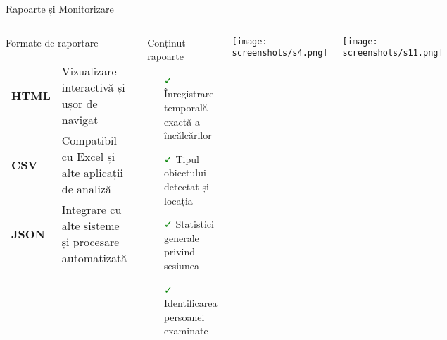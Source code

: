 \documentclass[aspectratio=169,9pt]{beamer}
\newenvironment{cardblock}[1]{%
    \begin{block}{#1}
}{%
    \end{block}
}
\begin{document}
\begin{frame}{Rapoarte și Monitorizare}
        \vspace{-1.3cm}
        \begin{columns}
                \hspace{0.25cm}
                        \begin{cardblock}{Formate de raportare}
                                \small
                                \begin{tabular}{p{1.5cm}p{6.5cm}}
                                        \cellcolor{lightblue!30}\textcolor{mainblue!60!black}{\textbf{HTML}} & Vizualizare interactivă și ușor de navigat \\
                                        \cellcolor{lightgreen}\textcolor{green!60!black}{\textbf{CSV}} & Compatibil cu Excel și alte aplicații de analiză \\
                                        \cellcolor{lightyellow}\textcolor{yellow!60!black}{\textbf{JSON}} & Integrare cu alte sisteme și procesare automatizată \\
                                \end{tabular}
                        \end{cardblock}    
                        \vspace{0.2cm}
                        
                        \begin{cardblock}{Conținut rapoarte}
                                \small
                                \begin{itemize}[leftmargin=0.5cm,itemsep=0.05cm]
                                        \item[\textcolor{green}{\faCheck}] Înregistrare temporală exactă a încălcărilor
                                        \item[\textcolor{green}{\faCheck}] Tipul obiectului detectat și locația
                                        \item[\textcolor{green}{\faCheck}] Statistici generale privind sesiunea
                                        \item[\textcolor{green}{\faCheck}] Identificarea persoanei examinate
                                \end{itemize}
                        \end{cardblock}
                        
                        \centering\texttt{[image: screenshots/s4.png]}
                        
                        \vspace{0.2cm}
                        
                        \centering\texttt{[image: screenshots/s11.png]}
        \end{columns}
\end{frame}
\end{document}

